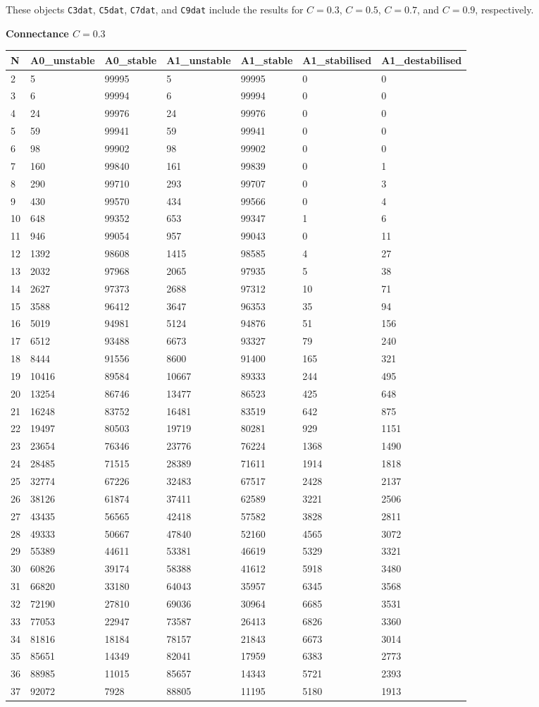 \documentclass[]{article}
\begin{document}
These objects \texttt{C3dat}, \texttt{C5dat}, \texttt{C7dat}, and
\texttt{C9dat} include the results for \(C = 0.3\), \(C = 0.5\),
\(C = 0.7\), and \(C = 0.9\), respectively.

\textbf{Connectance \(C = 0.3\)}

\begin{longtable}[]{@{}lllllll@{}}
\toprule
N & A0\_unstable & A0\_stable & A1\_unstable & A1\_stable &
A1\_stabilised & A1\_destabilised\tabularnewline
\midrule
\endhead
2 & 5 & 99995 & 5 & 99995 & 0 & 0\tabularnewline
3 & 6 & 99994 & 6 & 99994 & 0 & 0\tabularnewline
4 & 24 & 99976 & 24 & 99976 & 0 & 0\tabularnewline
5 & 59 & 99941 & 59 & 99941 & 0 & 0\tabularnewline
6 & 98 & 99902 & 98 & 99902 & 0 & 0\tabularnewline
7 & 160 & 99840 & 161 & 99839 & 0 & 1\tabularnewline
8 & 290 & 99710 & 293 & 99707 & 0 & 3\tabularnewline
9 & 430 & 99570 & 434 & 99566 & 0 & 4\tabularnewline
10 & 648 & 99352 & 653 & 99347 & 1 & 6\tabularnewline
11 & 946 & 99054 & 957 & 99043 & 0 & 11\tabularnewline
12 & 1392 & 98608 & 1415 & 98585 & 4 & 27\tabularnewline
13 & 2032 & 97968 & 2065 & 97935 & 5 & 38\tabularnewline
14 & 2627 & 97373 & 2688 & 97312 & 10 & 71\tabularnewline
15 & 3588 & 96412 & 3647 & 96353 & 35 & 94\tabularnewline
16 & 5019 & 94981 & 5124 & 94876 & 51 & 156\tabularnewline
17 & 6512 & 93488 & 6673 & 93327 & 79 & 240\tabularnewline
18 & 8444 & 91556 & 8600 & 91400 & 165 & 321\tabularnewline
19 & 10416 & 89584 & 10667 & 89333 & 244 & 495\tabularnewline
20 & 13254 & 86746 & 13477 & 86523 & 425 & 648\tabularnewline
21 & 16248 & 83752 & 16481 & 83519 & 642 & 875\tabularnewline
22 & 19497 & 80503 & 19719 & 80281 & 929 & 1151\tabularnewline
23 & 23654 & 76346 & 23776 & 76224 & 1368 & 1490\tabularnewline
24 & 28485 & 71515 & 28389 & 71611 & 1914 & 1818\tabularnewline
25 & 32774 & 67226 & 32483 & 67517 & 2428 & 2137\tabularnewline
26 & 38126 & 61874 & 37411 & 62589 & 3221 & 2506\tabularnewline
27 & 43435 & 56565 & 42418 & 57582 & 3828 & 2811\tabularnewline
28 & 49333 & 50667 & 47840 & 52160 & 4565 & 3072\tabularnewline
29 & 55389 & 44611 & 53381 & 46619 & 5329 & 3321\tabularnewline
30 & 60826 & 39174 & 58388 & 41612 & 5918 & 3480\tabularnewline
31 & 66820 & 33180 & 64043 & 35957 & 6345 & 3568\tabularnewline
32 & 72190 & 27810 & 69036 & 30964 & 6685 & 3531\tabularnewline
33 & 77053 & 22947 & 73587 & 26413 & 6826 & 3360\tabularnewline
34 & 81816 & 18184 & 78157 & 21843 & 6673 & 3014\tabularnewline
35 & 85651 & 14349 & 82041 & 17959 & 6383 & 2773\tabularnewline
36 & 88985 & 11015 & 85657 & 14343 & 5721 & 2393\tabularnewline
37 & 92072 & 7928 & 88805 & 11195 & 5180 & 1913\tabularnewline

\end{longtable}
\end{document}
